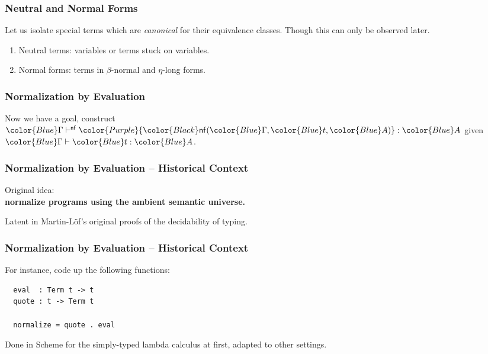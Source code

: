 \documentclass[svgnames]{beamer}
\newcommand\fmttm[1]{{\color{Blue}#1}}
\newcommand\fmtne[1]{{\color{DarkOrange}#1}}
\newcommand\fmtnf[1]{{\color{Purple}#1}}
\newcommand{\Uni}{\fmttm{\mathcal{U}}}
\newcommand{\Unit}{\fmttm{\mathsf{Unit}}}
\newcommand{\unit}{\fmttm{\mathsf{tt}}}
\newcommand{\var}[1]{\fmttm{\mathbf{x}_{\color{Black} #1}}}
\newcommand{\nevar}[1]{\fmtne{\mathbf{x}_{\color{Black} #1}}}
\newcommand{\isctx}[1]{\fmttm{#1}\vdash}
\newcommand{\isterm}[3]{\fmttm{#1}\vdash\fmttm{#2}:\fmttm{#3}}
\newcommand{\isneutral}[3]{\fmttm{#1}\vdash^{\mathsf{neu}}\fmtne{#2}:\fmttm{#3}}
\newcommand{\isnormal}[3]{\fmttm{#1}\vdash^{\mathsf{nf}}\fmtnf{#2}:\fmttm{#3}}
\newcommand{\istype}[2]{\fmttm{#1}\vdash\fmttm{#2}}
\newcommand{\subst}[3]{{\color{Black} \fmttm{#1}\{\fmttm{#2}/#3\}}}
\newcommand{\neapp}[2]{{\color{Black} \fmtne{#1}(\fmtnf{#2})}}
\newcommand{\nf}[3]{{\color{Black} \mathsf{nf}(\fmttm{#1}, \fmttm{#2}, \fmttm{#3})}}
\begin{document}
\begin{frame}
  \frametitle{Neutral and Normal Forms}
  Let us isolate special terms which are \emph{canonical} for their equivalence classes. Though this
  can only be observed later.

  \begin{enumerate}
  \item Neutral terms: variables or terms stuck on variables.
  \item Normal forms: terms in $\beta$-normal and $\eta$-long forms.
  \end{enumerate}
\end{frame}

\begin{frame}
  \frametitle{Normalization by Evaluation}
  \centering
  Now we have a goal, construct $\isnormal{\Gamma}{\nf{\Gamma}{t}{A}}{A}$ given $\isterm{\Gamma}{t}{A}$.
\end{frame}
\begin{frame}
  \frametitle{Normalization by Evaluation -- Historical Context}
  \centering
  Original idea:\\ \textbf{normalize programs using the ambient semantic universe.}

  \bigskip

  Latent in Martin-L\"of's original proofs of the decidability of typing.
\end{frame}

\begin{frame}[fragile]
  \frametitle{Normalization by Evaluation -- Historical Context}
  For instance, code up the following functions:
\begin{lstlisting}
  eval  : Term t -> t
  quote : t -> Term t

  normalize = quote . eval
\end{lstlisting}
  Done in Scheme for the simply-typed lambda calculus at first, adapted to other settings.
\end{frame}
\end{document}
